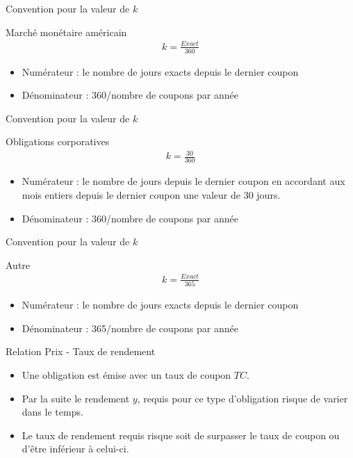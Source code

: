 \documentclass{beamer}
\begin{document}
\begin{frame}{Convention pour la valeur de $k$}
\begin{block}{Marché monétaire américain }
\begin{align*}
k=\frac{Exact}{360}
\end{align*}
\begin{itemize}
\item Numérateur : le nombre de jours exacts depuis le dernier coupon
\item Dénominateur : 360/nombre de coupons par année
\end{itemize}
\end{block}
\end{frame}

\begin{frame}{Convention pour la valeur de $k$}
\begin{block}{Obligations corporatives }
\begin{align*}
k=\frac{30}{360}
\end{align*}
\begin{itemize}
\item Numérateur : le nombre de jours depuis le dernier coupon en accordant aux mois entiers depuis le dernier coupon une valeur de 30 jours.
\item Dénominateur : 360/nombre de coupons par année
\end{itemize}
\end{block}
\end{frame}

\begin{frame}{Convention pour la valeur de $k$}
\begin{block}{Autre }
\begin{align*}
k=\frac{Exact}{365}
\end{align*}
\begin{itemize}
\item Numérateur : le nombre de jours exacts depuis le dernier coupon
\item Dénominateur : 365/nombre de coupons par année
\end{itemize}
\end{block}
\end{frame}

\begin{frame}{Relation Prix - Taux de rendement}
\begin{itemize}
\item Une obligation est émise avec un taux de coupon $TC$. 
\item Par la suite le rendement $y$, requis pour ce type d'obligation risque de varier dans le temps.
\item Le taux de rendement requis risque soit de surpasser le taux de coupon ou d'être inférieur à celui-ci. 
\end{itemize}
\end{frame}
\end{document}
